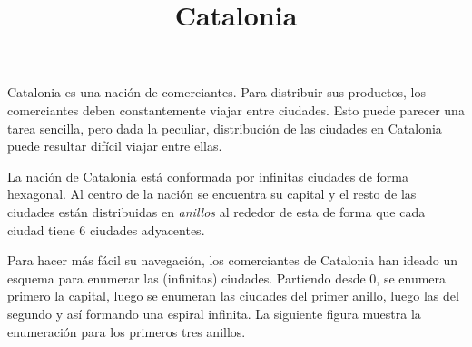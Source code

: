 \documentclass{oci}
\title{Catalonia}
\begin{document}
\begin{problemDescription}
Catalonia es una nación de comerciantes.
Para distribuir sus productos, los comerciantes deben constantemente
viajar entre ciudades.
Esto puede parecer una tarea sencilla, pero dada la peculiar, distribución de las ciudades
en Catalonia puede resultar difícil viajar entre ellas.

La nación de Catalonia está conformada por infinitas ciudades de forma hexagonal.
Al centro de la nación se encuentra su capital y el resto de las ciudades están distribuidas
en \emph{anillos} al rededor de esta de forma que cada ciudad tiene 6 ciudades adyacentes.

Para hacer más fácil su navegación, los comerciantes de Catalonia han ideado un esquema
para enumerar las (infinitas) ciudades.
Partiendo desde 0, se enumera primero la capital, luego se enumeran las ciudades del primer anillo,
luego las del segundo y así formando una espiral infinita.
La siguiente figura muestra la enumeración para los primeros tres anillos.

\newdimen\R
\R=1cm
\newcommand{\hex}[3][]{
  \begin{scope}[rotate=90, xshift=#3*1.5*\R, yshift=#2*-0.866*\R]
  \draw[thick,#1] (0:\R) \foreach \x in {60, 120,...,359} {
    --(\x:\R)
  } -- cycle(90:\R);
  \end{scope}
}
\newcommand{\pos}[2]{
  #1*0.866*\R, #2*1.5*\R
}
\begin{center}
\end{center}
\end{problemDescription}
\end{document}

